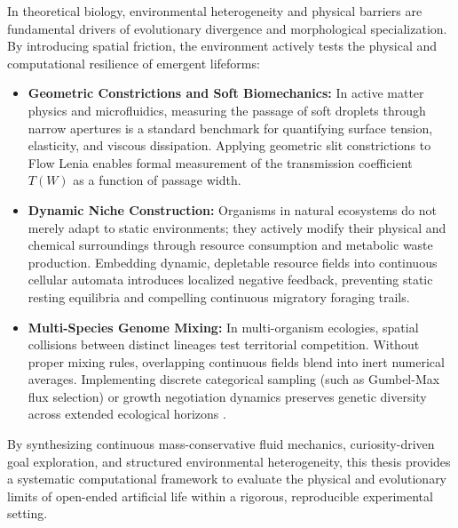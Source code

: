 In theoretical biology, environmental heterogeneity and physical barriers are fundamental drivers of evolutionary divergence and morphological specialization. By introducing spatial friction, the environment actively tests the physical and computational resilience of emergent lifeforms:
\begin{itemize}
    \item \textbf{Geometric Constrictions and Soft Biomechanics:} In active matter physics and microfluidics, measuring the passage of soft droplets through narrow apertures is a standard benchmark for quantifying surface tension, elasticity, and viscous dissipation. Applying geometric slit constrictions to Flow Lenia enables formal measurement of the transmission coefficient $T(W)$ as a function of passage width.
    \item \textbf{Dynamic Niche Construction:} Organisms in natural ecosystems do not merely adapt to static environments; they actively modify their physical and chemical surroundings through resource consumption and metabolic waste production. Embedding dynamic, depletable resource fields into continuous cellular automata introduces localized negative feedback, preventing static resting equilibria and compelling continuous migratory foraging trails.
    \item \textbf{Multi-Species Genome Mixing:} In multi-organism ecologies, spatial collisions between distinct lineages test territorial competition. Without proper mixing rules, overlapping continuous fields blend into inert numerical averages. Implementing discrete categorical sampling (such as Gumbel-Max flux selection) or growth negotiation dynamics preserves genetic diversity across extended ecological horizons \parencite{plantec2025flowlenia, michel2025exploring}.
\end{itemize}

By synthesizing continuous mass-conservative fluid mechanics, curiosity-driven goal exploration, and structured environmental heterogeneity, this thesis provides a systematic computational framework to evaluate the physical and evolutionary limits of open-ended artificial life within a rigorous, reproducible experimental setting.